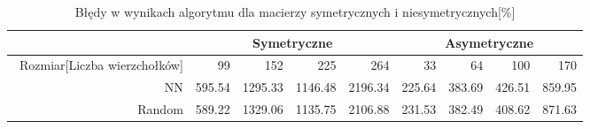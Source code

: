 \begin{table}
\begin{tabular}{|r|r|r|r|r|r|r|r|r|}
\hline
 & \multicolumn{4}{|c|}{Symetryczne} & \multicolumn{4}{|c|}{Asymetryczne} \\ \hline\
Rozmiar[Liczba wierzchołków] & 99 & 152 & 225 & 264 & 33 & 64 & 100 & 170 \\ \hline
NN & 595.54 & 1295.33 & 1146.48 & 2196.34 & 225.64 & 383.69 & 426.51 & 859.95 \\
Random & 589.22 & 1329.06 & 1135.75 & 2106.88 & 231.53 & 382.49 & 408.62 & 871.63 \\ \hline
\end{tabular}
\caption{Błędy w wynikach algorytmu dla macierzy symetrycznych i niesymetrycznych[\%]}
\label{tab:error_AnNeigMet}
\end{table}
